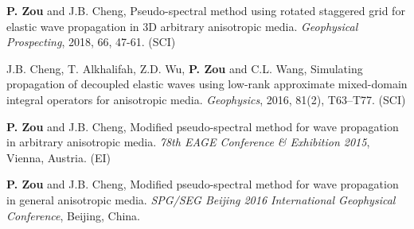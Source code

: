 
\begin{publications}{99}

\item \textbf{P. Zou} and J.B. Cheng, Pseudo-spectral method using rotated 
	staggered grid for elastic wave propagation in 3D arbitrary anisotropic 
	media. \textit{Geophysical Prospecting}, 2018, 66, 47-61. \hspace{3ex}(SCI)

\vspace{-2ex}
\item J.B. Cheng, T. Alkhalifah, Z.D. Wu, \textbf{P. Zou} and C.L. Wang, 
	Simulating propagation of decoupled elastic waves using low-rank 
	approximate mixed-domain integral operators for anisotropic media.
	\textit{Geophysics}, 2016, 81(2), T63--T77. \hspace{3ex}(SCI)

\vspace{-2ex}
\item \textbf{P. Zou} and J.B. Cheng, Modified pseudo-spectral method for wave 
	propagation in arbitrary anisotropic media. \textit{78th EAGE 
	Conference \& Exhibition 2015}, Vienna, Austria. \hspace{3ex}(EI)

\vspace{-2ex} 
\item \textbf{P. Zou} and J.B. Cheng, Modified pseudo-spectral method for wave 
	propagation in general anisotropic media. \textit{SPG/SEG Beijing 
	2016 International Geophysical Conference}, Beijing, China.
    
\end{publications}


